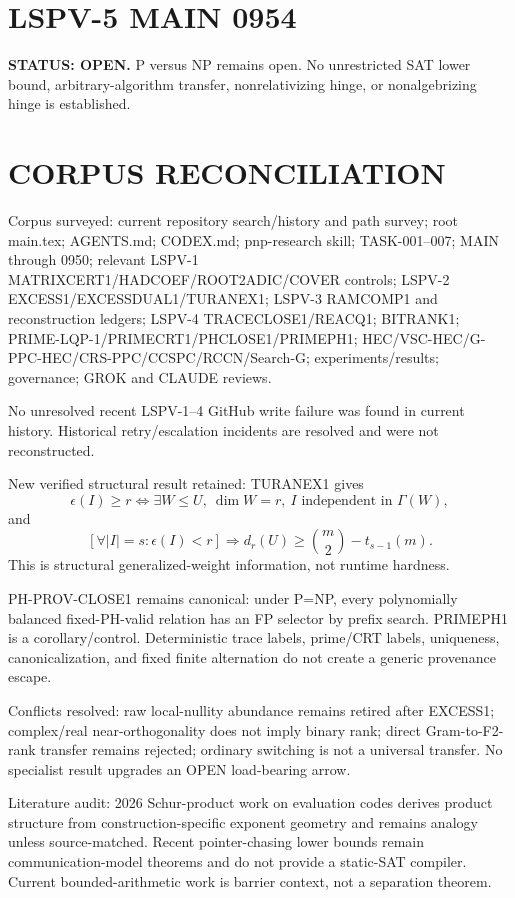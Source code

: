 \documentclass{article}
\begin{document}
\section*{LSPV-5 MAIN 0954}
\textbf{STATUS: OPEN.} P versus NP remains open. No unrestricted SAT lower bound, arbitrary-algorithm transfer, nonrelativizing hinge, or nonalgebrizing hinge is established.

\section*{CORPUS RECONCILIATION}
Corpus surveyed: current repository search/history and path survey; root main.tex; AGENTS.md; CODEX.md; pnp-research skill; TASK-001--007; MAIN through 0950; relevant LSPV-1 MATRIXCERT1/HADCOEF/ROOT2ADIC/COVER controls; LSPV-2 EXCESS1/EXCESSDUAL1/TURANEX1; LSPV-3 RAMCOMP1 and reconstruction ledgers; LSPV-4 TRACECLOSE1/REACQ1; BITRANK1; PRIME-LQP-1/PRIMECRT1/PHCLOSE1/PRIMEPH1; HEC/VSC-HEC/G-PPC-HEC/CRS-PPC/CCSPC/RCCN/Search-G; experiments/results; governance; GROK and CLAUDE reviews.

No unresolved recent LSPV-1--4 GitHub write failure was found in current history. Historical retry/escalation incidents are resolved and were not reconstructed.

New verified structural result retained: TURANEX1 gives
\[
\epsilon(I)\ge r\iff \exists W\le U,\ \dim W=r,\ I\text{ independent in }\Gamma(W),
\]
and
\[
[\forall |I|=s:\epsilon(I)<r]\Rightarrow d_r(U)\ge {m\choose2}-t_{s-1}(m).
\]
This is structural generalized-weight information, not runtime hardness.

PH-PROV-CLOSE1 remains canonical: under P=NP, every polynomially balanced fixed-PH-valid relation has an FP selector by prefix search. PRIMEPH1 is a corollary/control. Deterministic trace labels, prime/CRT labels, uniqueness, canonicalization, and fixed finite alternation do not create a generic provenance escape.

Conflicts resolved: raw local-nullity abundance remains retired after EXCESS1; complex/real near-orthogonality does not imply binary rank; direct Gram-to-F2-rank transfer remains rejected; ordinary switching is not a universal transfer. No specialist result upgrades an OPEN load-bearing arrow.

Literature audit: 2026 Schur-product work on evaluation codes derives product structure from construction-specific exponent geometry and remains analogy unless source-matched. Recent pointer-chasing lower bounds remain communication-model theorems and do not provide a static-SAT compiler. Current bounded-arithmetic work is barrier context, not a separation theorem.
\end{document}
